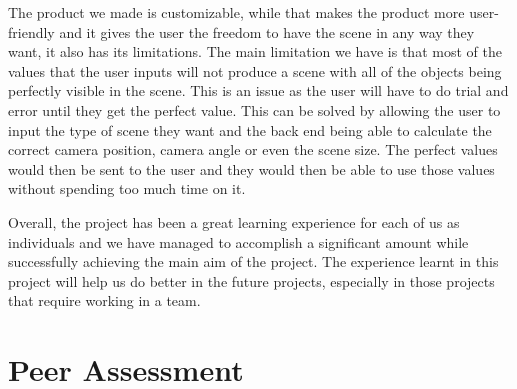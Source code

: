 \documentclass[a4paper]{report}
\begin{document}
	\par The product we made is customizable, while that makes the product more user-friendly and it gives the user the freedom to have the scene in any way they want, it also has its limitations. The main limitation we have is that most of the values that the user inputs will not produce a scene with all of the objects being perfectly visible in the scene. This is an issue as the user will have to do trial and error until they get the perfect value. This can be solved by allowing the user to input the type of scene they want and the back end being able to calculate the correct camera position, camera angle or even the scene size. The perfect values would then be sent to the user and they would then be able to use those values without spending too much time on it. \newline
	
	\par  Overall, the project has been a great learning experience for each of us as individuals and we have managed to accomplish a significant amount while successfully achieving the main aim of the project. The experience learnt in this project will help us do better in the future projects, especially in those projects that require working in a team.
	
	
	\section{Peer Assessment}
	\begin{table}[ht!]
		\begin{center}
			\caption{Peer Assessment}
		\end{center}
	\end{table}
	\clearpage
	
	
\end{document}
